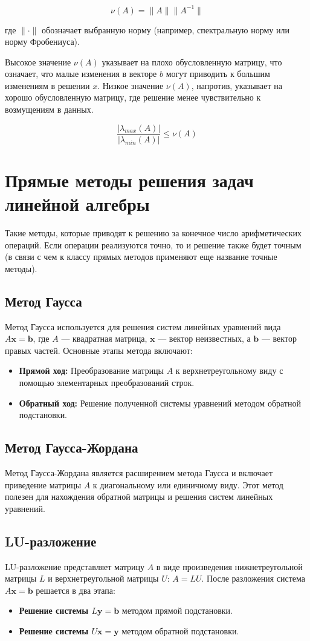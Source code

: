 \documentclass{article}
\begin{document}
\[ \nu(A) = \|A\| \|A^{-1}\| \]

где \(\|\cdot\|\) обозначает выбранную норму (например, спектральную норму или норму Фробениуса).

Высокое значение \(\nu(A)\) указывает на плохо обусловленную матрицу, что означает, что малые изменения в векторе \(b\) могут приводить к большим изменениям в решении \(x\). Низкое значение \(\nu(A)\), напротив, указывает на хорошо обусловленную матрицу, где решение менее чувствительно к возмущениям в данных.

$$\frac{|\lambda_{max}(A)|}{|\lambda_{min}(A)|}\leqslant \nu (A)$$
\section{Прямые методы решения задач линейной алгебры}
Такие методы, которые приводят к решению 
за конечное число арифметических операций. Если операции реализуются 
точно, то и решение также будет точным (в связи с чем к классу прямых 
методов применяют еще название точные методы). 
\subsection{Метод Гаусса}
Метод Гаусса используется для решения систем линейных уравнений вида $A\mathbf{x} = \mathbf{b}$, где $A$ — квадратная матрица, $\mathbf{x}$ — вектор неизвестных, а $\mathbf{b}$ — вектор правых частей. Основные этапы метода включают:
\begin{itemize}
    \item \textbf{Прямой ход:} Преобразование матрицы $A$ к верхнетреугольному виду с помощью элементарных преобразований строк.
    \item \textbf{Обратный ход:} Решение полученной системы уравнений методом обратной подстановки.
\end{itemize}

\subsection{Метод Гаусса-Жордана}
Метод Гаусса-Жордана является расширением метода Гаусса и включает приведение матрицы $A$ к диагональному или единичному виду. Этот метод полезен для нахождения обратной матрицы и решения систем линейных уравнений.

\subsection{LU-разложение}
LU-разложение представляет матрицу $A$ в виде произведения нижнетреугольной матрицы $L$ и верхнетреугольной матрицы $U$: $A = LU$. После разложения система $A\mathbf{x} = \mathbf{b}$ решается в два этапа:
\begin{itemize}
    \item \textbf{Решение системы $L\mathbf{y} = \mathbf{b}$} методом прямой подстановки.
    \item \textbf{Решение системы $U\mathbf{x} = \mathbf{y}$} методом обратной подстановки.
\end{itemize}
\end{document}
